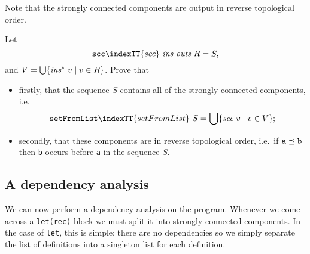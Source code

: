 Note that the strongly connected components are output in reverse
topological order.

\begin{exercise}\label{ll:X:sccs}
Let
\[
\mbox{\tt scc}\indexTT{scc}~ \mbox{\it ins}~\mbox{\it outs}~ R
  = S,
\]
and $V = \bigcup \{\mbox{\it ins}^\ast~v \mathrel{|} v\in R\}$.
Prove that
\begin{itemize}
\item firstly, that the sequence $S$ contains all of the strongly
connected components, i.e.
\[
 \mbox{\tt setFromList}\indexTT{setFromList}~S = \bigcup \{\mbox{\it scc}~v \mathrel{|} v\in V\};
\]
\item secondly, that these components are in reverse topological order,
i.e.\ if $\mbox{\tt a}\preceq \mbox{\tt b}$ then \mbox{\tt b} occurs before \mbox{\tt a} in the
sequence $S$.
\end{itemize}
\end{exercise}

\subsection{A dependency analysis}

We can now perform a dependency analysis on the program. Whenever we
come across a \mbox{\tt let(rec)} block we must split it into strongly connected
components.  In the case of \mbox{\tt let}, this is simple; there are no
dependencies so we simply separate the list of definitions into a
singleton list for each definition.


